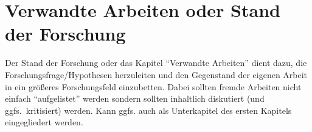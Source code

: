 \chapter{Verwandte Arbeiten oder Stand der Forschung}
Der Stand der Forschung oder das Kapitel \enquote{Verwandte Arbeiten} dient dazu, die Forschungsfrage/Hypothesen herzuleiten und den Gegenstand der eigenen Arbeit in ein größeres Forschungsfeld einzubetten. Dabei sollten fremde Arbeiten nicht einfach \enquote{aufgelistet} werden sondern sollten inhaltlich diskutiert (und ggfs.~kritisiert) werden. 
Kann ggfs. auch als Unterkapitel des ersten Kapitels eingegliedert werden.